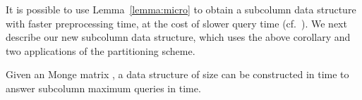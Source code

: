 \documentclass{llncs}
\begin{document}
It is possible to use Lemma~\ref{lemma:micro} to obtain a subcolumn data
structure with faster  preprocessing time,
at the cost of slower  query time (cf.~\cite[Lemma
2]{ourICALP}).  We next describe our new subcolumn data structure, which uses the above corollary and two applications of
the partitioning scheme.


















\begin{theorem}
\label{thm:subcolumn2}
Given an  Monge matrix , a data structure of size  can be constructed
in  time to answer subcolumn maximum queries in  time.
\end{theorem}
\end{document}
